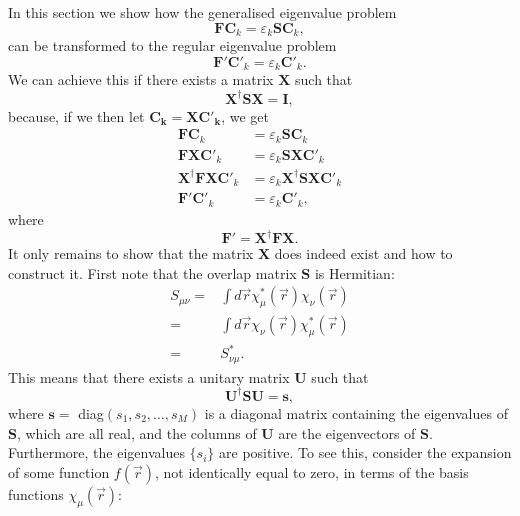 In this section we show how the generalised eigenvalue problem
\begin{equation}
 \mathbf{FC}_k = \varepsilon_k\mathbf{SC}_k,
\end{equation}
can be transformed to the regular eigenvalue problem
\begin{equation}
 \mathbf F'\mathbf C'_k = \varepsilon_k\mathbf C'_k.
\end{equation}
We can achieve this if there exists a matrix $\mathbf X$ such that
\begin{equation}
 \mathbf{X^\dagger S X = I},
\end{equation}
because, if we then let $\mathbf{C_k = X C'_k}$, we get
\begin{equation}
\begin{split}
 \mathbf{FC}_k & = \varepsilon_k\mathbf{SC}_k \\
 \mathbf{FXC}'_k & = \varepsilon_k\mathbf{SXC}'_k \\
 \mathbf{X^\dagger FXC}'_k & = \varepsilon_k\mathbf{X^\dagger SXC}'_k \\
 \mathbf F' \mathbf C'_k & = \varepsilon_k\mathbf C'_k,
\end{split}
\end{equation}
where
\begin{equation}
 \mathbf{F' = X^\dagger FX}.
\end{equation}
It only remains to show that the matrix $\mathbf X$ does indeed exist and how to construct it. First note that the overlap matrix $\mathbf S$ is Hermitian:
\begin{equation}
\begin{split}
 S_{\mu\nu} = & \int d\vec r \chi^*_\mu(\vec r) \chi_\nu(\vec r) \\
            = & \int d\vec r \chi_\nu(\vec r) \chi^*_\mu(\vec r) \\
            = & S^*_{\nu\mu}.
\end{split}
\end{equation}
This means that there exists a unitary matrix $\mathbf U$ such that
\begin{equation}
\label{eq:similarity_transf}
 \mathbf{U^\dagger S U = s},
\end{equation}
where $\mathbf s =$ diag$(s_1, s_2, \dots, s_M)$ is a diagonal matrix containing the eigenvalues of $\mathbf S$, which are all real, and the columns of $\mathbf U$ are the eigenvectors of $\mathbf S$.
Furthermore, the eigenvalues $\{s_i\}$ are positive. To see this, consider the expansion of some function $f(\vec r)$, not identically equal to zero, in terms of the basis functions $\chi_\mu(\vec r)$:

